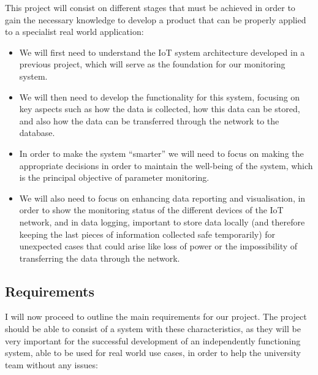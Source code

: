 \documentclass[12pt]{article}
\begin{document}
This project will consist on different stages that must be achieved in order to gain the necessary knowledge to develop a product that can be properly applied to a specialist real world application: 
\begin{itemize}
    \item We will first need to understand the IoT system architecture developed in a previous project, which will serve as the foundation for our monitoring system.
    \item We will then need to develop the functionality for this system, focusing on key aspects such as how the data is collected, how this data can be stored, and also how the data can be transferred through the network to the database.
    \item In order to make the system ``smarter'' we will need to focus on making the appropriate decisions in order to maintain the well-being of the system, which is the principal objective of parameter monitoring.
    \item We will also need to focus on enhancing data reporting and visualisation, in order to show the monitoring status of the different devices of the IoT network, and in data logging, important to store data locally (and therefore keeping the last pieces of information collected safe temporarily) for unexpected cases that could arise like loss of power or the impossibility of transferring the data through the network.
\end{itemize}

\subsection{Requirements}

I will now proceed to outline the main requirements for our project. The project should be able to consist of a system with these characteristics, as they will be very important for the successful development of an independently functioning system, able to be used for real world use cases, in order to help the university team without any issues:
\end{document}
